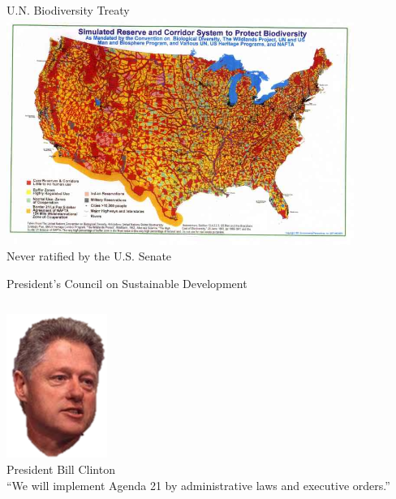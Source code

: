 \begin{frame}{U.N. Biodiversity Treaty}
    \centering
    \includegraphics[width=0.85\textwidth]{img/biodiversity.png} \\
    Never ratified by the U.S. Senate \\
\end{frame}

\begin{frame}{President's Council on Sustainable Development}
    \begin{columns}[onlytextwidth]
            \centering
            \includegraphics[width=.75\textwidth]{img/clinton.png} \\
            President Bill Clinton \\

            ``We will implement Agenda 21 by administrative laws and executive orders.''
    \end{columns}
\end{frame}

